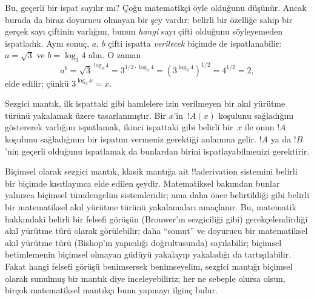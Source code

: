 \documentclass[../../../include/open-logic-chapter]{subfiles}
\begin{document}
Bu, geçerli bir ispat sayılır mı? Çoğu matematikçi öyle olduğunu düşünür.
Ancak burada da biraz doyurucu olmayan bir şey vardır: belirli bir özelliğe
sahip bir gerçek sayı çiftinin varlığını, bunun \emph{hangi} sayı çifti
olduğunu söyleyemeden ispatladık. Aynı sonuç, $a$, $b$ çifti ispatta
\emph{verilecek} biçimde de ispatlanabilir: $a = \sqrt{3}$ ve $b = \log_3 4$
alın. O zaman
\[
a^b = \sqrt{3}^{\log_3 4} = 3^{1/2 \cdot \log_3 4} = (3^{\log_3
  4})^{1/2} = 4^{1/2}= 2,
\]
elde edilir; çünkü $3^{\log_3 x} = x$.

Sezgici mantık, ilk ispattaki gibi hamlelere izin verilmeyen bir akıl yürütme
türünü yakalamak üzere tasarlanmıştır. Bir $x$'in~$!A(x)$ koşulunu sağladığını
göstererek varlığını ispatlamak, ikinci ispattaki gibi belirli bir~$x$ ile onun $!A$
koşulunu sağladığının bir ispatını vermeniz gerektiği anlamına gelir. $!A$ ya
da $!B$'nin geçerli olduğunu ispatlamak da bunlardan birini ispatlayabilmenizi
gerektirir.

Biçimsel olarak sezgici mantık, klasik mantığa ait !!a{derivation} sistemini
belirli bir biçimde kısıtlayınca elde edilen şeydir. Matematiksel bakımdan
bunlar yalnızca biçimsel tümdengelim sistemleridir; ama daha önce belirtildiği
gibi belirli bir matematiksel akıl yürütme türünü yakalamaları amaçlanır. Bu,
matematik hakkındaki belirli bir felsefi görüşün (Brouwer'ın sezgiciliği gibi)
gerekçelendirdiği akıl yürütme türü olarak görülebilir; daha ``somut'' ve
doyurucu bir matematiksel akıl yürütme türü (Bishop'ın yapıcılığı doğrultusunda)
sayılabilir; biçimsel betimlemenin biçimsel olmayan güdüyü yakalayıp
yakaladığı da tartışılabilir. Fakat hangi felsefi görüşü benimsersek
benimseyelim, sezgici mantığı biçimsel olarak sunulmuş bir mantık diye
inceleyebiliriz; her ne sebeple olursa olsun, birçok matematiksel mantıkçı bunu
yapmayı ilginç bulur.
\end{document}
